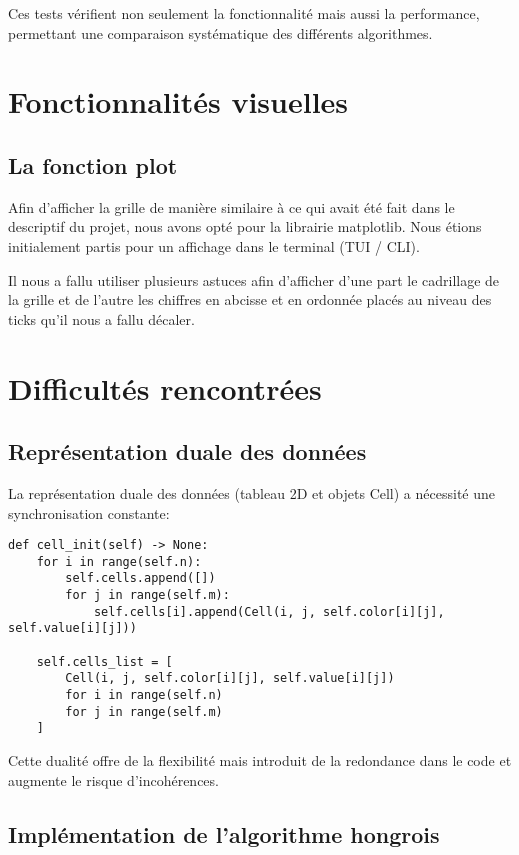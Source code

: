 \documentclass[11pt, a4paper]{article}
\begin{document}
Ces tests vérifient non seulement la fonctionnalité mais aussi la performance, permettant une comparaison systématique des différents algorithmes.

\section{Fonctionnalités visuelles}
\label{sec:visualisation}

\subsection{La fonction plot}

Afin d'afficher la grille de manière similaire à ce qui avait été fait dans le descriptif du projet, nous avons opté pour la librairie matplotlib.
Nous étions initialement partis pour un affichage dans le terminal (TUI / CLI).

Il nous a fallu utiliser plusieurs astuces afin d'afficher d'une part le cadrillage de la grille et de l'autre les chiffres en abcisse et en ordonnée placés au niveau des ticks qu'il nous a fallu décaler.

\section{Difficultés rencontrées}
\label{sec:difficultes}

\subsection{Représentation duale des données}

La représentation duale des données (tableau 2D et objets Cell) a nécessité une synchronisation constante:

\begin{lstlisting}[caption=Initialisation des cellules]
def cell_init(self) -> None:
    for i in range(self.n):
        self.cells.append([])
        for j in range(self.m):
            self.cells[i].append(Cell(i, j, self.color[i][j], self.value[i][j]))

    self.cells_list = [
        Cell(i, j, self.color[i][j], self.value[i][j])
        for i in range(self.n)
        for j in range(self.m)
    ]
\end{lstlisting}

Cette dualité offre de la flexibilité mais introduit de la redondance dans le code et augmente le risque d'incohérences.

\subsection{Implémentation de l'algorithme hongrois}
\end{document}
